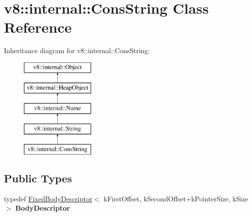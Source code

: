 \hypertarget{classv8_1_1internal_1_1_cons_string}{}\section{v8\+:\+:internal\+:\+:Cons\+String Class Reference}
\label{classv8_1_1internal_1_1_cons_string}
Inheritance diagram for v8\+:\+:internal\+:\+:Cons\+String\+:\begin{figure}[H]
\begin{center}
\leavevmode
\includegraphics[height=5.000000cm]{classv8_1_1internal_1_1_cons_string}
\end{center}
\end{figure}
\subsection*{Public Types}
\begin{DoxyCompactItemize}
\item 
\hypertarget{classv8_1_1internal_1_1_cons_string_a9605778fa02003dffc396b8a7842d380}{}typedef \hyperlink{classv8_1_1internal_1_1_fixed_body_descriptor}{Fixed\+Body\+Descriptor}$<$ k\+First\+Offset, k\+Second\+Offset+k\+Pointer\+Size, k\+Size $>$ {\bfseries Body\+Descriptor}\label{classv8_1_1internal_1_1_cons_string_a9605778fa02003dffc396b8a7842d380}

\end{DoxyCompactItemize}
